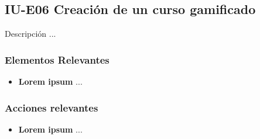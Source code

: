 
\subsection{IU-E06 Creación de un curso gamificado}

 Descripción ...


\subsubsection{Elementos Relevantes}

    \begin{itemize}
    \item {\bf Lorem ipsum}
        ...
    \end{itemize}

\subsubsection{Acciones relevantes}

    \begin{itemize}
    \item {\bf Lorem ipsum}
        ...
    \end{itemize}

\clearpage
